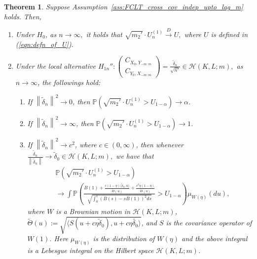 \documentclass[11pt]{article}
\theoremstyle{plain}
\newtheorem{theorem}{Theorem}[section]
\theoremstyle{definition}
\theoremstyle{remark}
\begin{document}
\begin{theorem}\label{thm:asymp_indep_lag_m}
        Suppose Assumption~\ref{ass:FCLT_cross_cov_indep_upto_lag_m} holds. Then,
        \begin{enumerate}
            \item Under $H_0$, as $n \to \infty,$ it holds that
            $\sqrt{m_2'}\cdot U^{(1)}_n\overset{D}{\to}U,
$
where $U$ is defined in (\ref{eqn:defn_of_U}). 
            \item Under the local alternative $H_{1n}'':\begin{pmatrix}
    C_{X_0,Y_{-m:m}}\\
    C_{Y_0,X_{-m:m}}
\end{pmatrix}=\frac{\tilde{\delta}_n}{\sqrt{n'}}\in \mathcal{H}(K,L;m),$ as $n \to \infty$, the followings hold:
    \begin{enumerate}
        \item [(a)] If $\left\|\tilde{\delta}_n\right\|^2\to 0$, then $\mathbb{P}(\sqrt{m_2'}\cdot U^{(1)}_n>U_{1-\alpha}) \to \alpha$. 
        \item[(b)] If $\left\|\tilde{\delta}_n\right\|^2 \to \infty$, then $\mathbb{P}(\sqrt{m_2'}\cdot U^{(1)}_n>U_{1-\alpha}) \to 1$. 
        \item [(c)] If $\left\|\tilde{\delta}_n\right\|^2 \to c^2$, where $c \in (0,\infty)$, then whenever $\frac{\tilde{\delta}_n}{\left\|\tilde{\delta}_n\right\|}\to \tilde{\delta}_0 \in \mathcal{H}(K,L;m),$ we have that
       \begin{align*}
          &\mathbb{P}(\sqrt{m_2'}\cdot U^{(1)}_n>U_{1-\alpha})\\
          &\to \int \mathbb{P}\left(\frac{B(1)+\frac{c (1-\eta) \langle \tilde{\delta}_0, u \rangle}{\tilde{\Theta}(u)}+\frac{c^2 \eta (1-\eta)}{\tilde{\Theta}(u)}}{\sqrt{\int_{0}^{1}\left(B(s)-sB(1)\right)^2 ds}}>U_{1-\alpha}\right)\mu_{W(\eta)}(du),
        \end{align*}
         where $W$ is a Brownian motion in $\mathcal{H}(K,L;m)$,\\ $\tilde{\Theta}(u):=\sqrt{\langle S(u+c \eta \tilde{\delta}_0), u+c \eta \tilde{\delta_0}\rangle}$, and $S$ is the covariance operator of $W(1)$. Here $\mu_{W(\eta)}$ is the distribution of $W(\eta)$ and the above integral is a Lebesgue integral on the Hilbert space $\mathcal{H}(K,L;m)$.
    \end{enumerate}
        \end{enumerate}
    \end{theorem}
\end{document}
